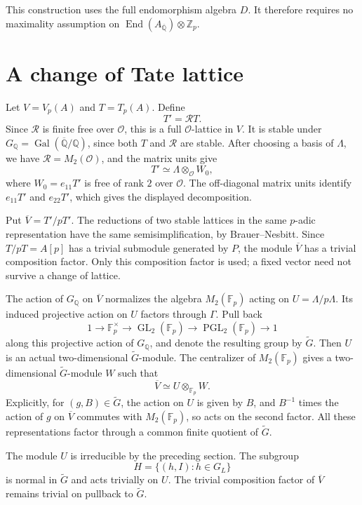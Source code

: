 \documentclass[11pt]{article}
\newcommand{\Q}{\mathbb Q}
\newcommand{\Z}{\mathbb Z}
\newcommand{\F}{\mathbb F}
\DeclareMathOperator{\End}{End}
\DeclareMathOperator{\Gal}{Gal}
\DeclareMathOperator{\GL}{GL}
\DeclareMathOperator{\PGL}{PGL}
\begin{document}
This construction uses the full endomorphism algebra \(D\).
It therefore requires no maximality assumption on
\(\End(A_{\overline{\Q}})\otimes\Z_p\).

\section{A change of Tate lattice}

Let \(V=V_p(A)\) and \(T=T_p(A)\). Define
\[
 T'=\mathcal R T.
\]
Since \(\mathcal R\) is finite free over \(\mathcal O\), this is a
full \(\mathcal O\)-lattice in \(V\). It is stable under
\(G_{\Q}=\Gal(\overline{\Q}/\Q)\), since both \(T\) and
\(\mathcal R\) are stable. After choosing a basis of \(\Lambda\),
we have \(\mathcal R=M_2(\mathcal O)\), and the matrix units give
\[
 T'\simeq\Lambda\otimes_{\mathcal O} W_0,
\]
where \(W_0=e_{11}T'\) is free of rank \(2\) over \(\mathcal O\).
The off-diagonal matrix units identify \(e_{11}T'\) and
\(e_{22}T'\), which gives the displayed decomposition.

Put \(\overline V=T'/pT'\). The reductions of two stable lattices
in the same \(p\)-adic representation have the same
semisimplification, by Brauer--Nesbitt. Since
\(T/pT=A[p]\) has a trivial submodule generated by \(P\), the module
\(\overline V\) has a trivial composition factor. Only this
composition factor is used; a fixed vector need not survive a
change of lattice.

The action of \(G_{\Q}\) on \(\overline V\) normalizes the algebra
\(M_2(\F_p)\) acting on \(U=\Lambda/p\Lambda\). Its induced
projective action on \(U\) factors through \(\Gamma\). Pull back
\[
 1\longrightarrow\F_p^\times\longrightarrow\GL_2(\F_p)
 \longrightarrow\PGL_2(\F_p)\longrightarrow1
\]
along this projective action of \(G_{\Q}\), and denote the resulting
group by \(\widetilde G\). Then \(U\) is an actual
two-dimensional \(\widetilde G\)-module. The centralizer of
\(M_2(\F_p)\) gives a two-dimensional \(\widetilde G\)-module \(W\)
such that
\[
 \overline V\simeq U\otimes_{\F_p} W.
\]
Explicitly, for \((g,B)\in\widetilde G\), the action on \(U\) is
given by \(B\), and \(B^{-1}\) times the action of \(g\) on
\(\overline V\) commutes with \(M_2(\F_p)\), so acts on the second
factor. All these representations factor through a common finite
quotient of \(\widetilde G\).

The module \(U\) is irreducible by the preceding section. The subgroup
\[
 H=\{(h,I):h\in G_L\}
\]
is normal in \(\widetilde G\) and acts trivially on \(U\). The
trivial composition factor of \(\overline V\) remains trivial on
pullback to \(\widetilde G\).
\end{document}
